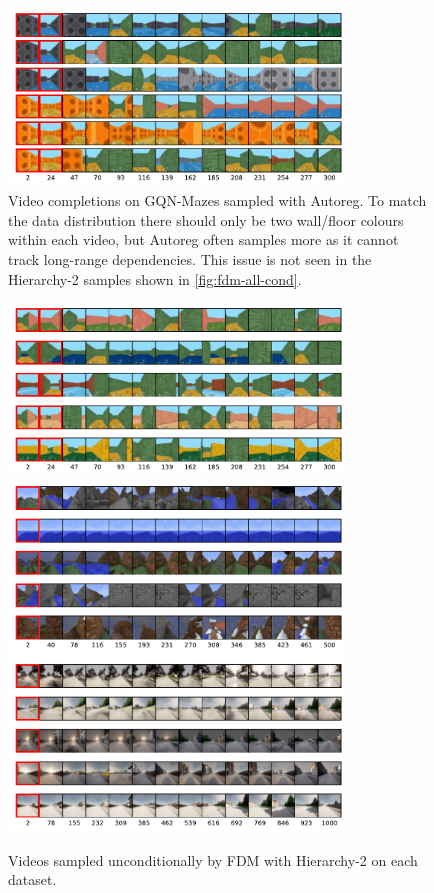 \begin{figure}
    \centering
    \includegraphics[width=0.8\textwidth]{figs/fdm/mazes-autoreg.pdf}
    \caption{Video completions on GQN-Mazes sampled with Autoreg. To match the data distribution there should only be two wall/floor colours within each video, but Autoreg often samples more as it cannot track long-range dependencies. This issue is not seen in the Hierarchy-2 samples shown in \cref{fig:fdm-all-cond}.}
    \label{fig:fdm-mazes-autoreg}
\end{figure}


\begin{figure}
    \centering
    \includegraphics[width=0.8\textwidth]{figs/fdm/mazes-uncond.pdf}
    \label{fig:fdm-mazes-uncond}
    \includegraphics[width=0.8\textwidth]{figs/fdm/minerl-uncond.pdf}
    \includegraphics[width=0.8\textwidth]{figs/fdm/carla-uncond.pdf}
    \caption{Videos sampled unconditionally by FDM with Hierarchy-2 on each dataset.}
    \label{fig:fdm-carla-uncond}
\end{figure}
